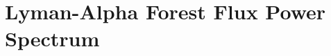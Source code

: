 \documentclass[a4paper,11pt]{article}
\newcommand{\Lya}{Lyman-$\alpha$}
\begin{document}




\section{Lyman-Alpha Forest Flux Power Spectrum}
\label{sec:lymanalpha}

\end{document}
